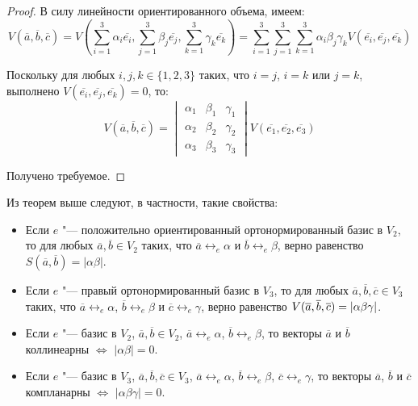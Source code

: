     \begin{proof}
    	В силу линейности ориентированного объема, имеем:
    	\[V(\overline{a}, \overline{b}, \overline{c}) = V\left(\sum_{i = 1}^{3} \alpha_i\overline{e_i}, \sum_{j = 1}^{3} \beta_j\overline{e_j},  \sum_{k = 1}^{3} \gamma_k\overline{e_k}\right) = \sum_{i = 1}^{3} \sum_{j = 1}^{3}\sum_{k = 1}^{3}\alpha_i\beta_j\gamma_kV(\overline{e_i}, \overline{e_j}, \overline{e_k})\]
    	
    	Поскольку для любых $i, j, k \in \{1, 2, 3\}$ таких, что $i = j$, $i = k$ или $j = k$, выполнено $V(\overline{e_i}, \overline{e_j}, \overline{e_k}) = 0$, то:
    	\[V(\overline{a}, \overline{b}, \overline{c}) = \begin{vmatrix}
    	\alpha_1 & \beta_1 & \gamma_1\\
    	\alpha_2 & \beta_2 & \gamma_2\\
    	\alpha_3 & \beta_3 & \gamma_3
    	\end{vmatrix}V(\overline{e_1}, \overline{e_2}, \overline{e_3})\]
    
    	Получено требуемое.
    \end{proof}
    
    \begin{note}
    	Из теорем выше следуют, в частности, такие свойства:
    	\begin{itemize}
    		\item Если $e$ "--- положительно ориентированный ортонормированный базис в $V_2$, то для любых $\overline a, \overline b \in V_2$ таких, что $\overline a \leftrightarrow_e \alpha$ и $\overline b \leftrightarrow_e \beta$, верно равенство $S(\overline{a}, \overline{b}) = |\alpha\beta|$.
    		\item Если $e$ "--- правый ортонормированный базис в $V_3$, то для любых $\overline a, \overline b, \overline c \in V_3$ таких, что $\overline a \leftrightarrow_e \alpha$, $\overline b \leftrightarrow_e \beta$ и $\overline c \leftrightarrow_e \gamma$, верно равенство $V(\overline{a}, \overline{b}, \overline{c}) \hm{=} |\alpha\beta\gamma|$.
    		\item Если $e$ "--- базис в $V_2$, $\overline a, \overline b \in V_2$, $\overline a \leftrightarrow_e \alpha$, $\overline b \leftrightarrow_e \beta$, то векторы $\overline{a}$ и $\overline{b}$ коллинеарны $\Leftrightarrow$ $|\alpha\beta| = 0$.
    		\item Если $e$ "--- базис в $V_3$, $\overline a, \overline b, \overline c \in V_3$, $\overline a \leftrightarrow_e \alpha$, $\overline b \leftrightarrow_e \beta$, $\overline c \leftrightarrow_e \gamma$, то векторы $\overline{a}$, $\overline{b}$ и $\overline{c}$ компланарны $\Leftrightarrow$ $|\alpha\beta\gamma| = 0$.
    	\end{itemize}
    \end{note}
    